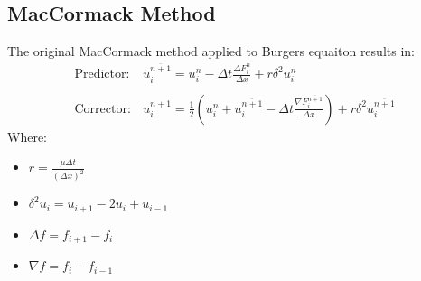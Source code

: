 \documentclass[11pt, a4paper]{article}
\begin{document}

\subsection{MacCormack Method}
The original MacCormack method applied to Burgers equaiton results in:
\begin{equation}
    \begin{array}{cc}
        \displaystyle\mathrm{Predictor:} & \displaystyle u_i^{\overline{n+1}}=u_i^n-\Delta t\frac{\Delta F_i^n}{\Delta x}+r\delta^2u_i^n \\\\ 
        \displaystyle\mathrm{Corrector:} & \displaystyle u_i^{n+1}=\frac{1}{2}\left(u_i^n+u_i^{\overline{n+1}}-\Delta t\frac{\nabla F_i^{\overline{n+1}}}{\Delta x}\right)+r\delta^2u_i^{\overline{n+1}}
    \end{array}
\end{equation}
Where:
\begin{itemize}
    \item $\displaystyle r=\frac{\mu\Delta t}{\left(\Delta x\right)^2}$
    \item $\displaystyle \delta^2u_i=u_{i+1}-2u_i+u_{i-1}$
    \item $\Delta f=f_{i+1}-f_i$
    \item $\nabla f=f_i-f_{i-1}$
\end{itemize}
\end{document}
